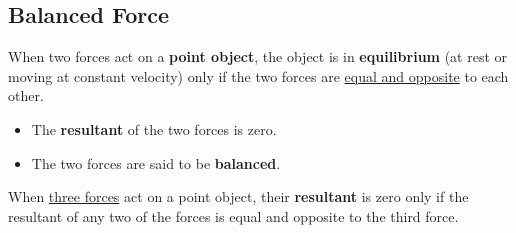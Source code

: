 \subsection{Balanced Force}

When two forces act on a \textbf{point object}, the object is in \textbf{equilibrium} (at rest or moving at constant velocity) only if the two forces are \underline{equal and opposite} to each other.
\begin{itemize}
    \item The \textbf{resultant} of the two forces is zero.
    \item The two forces are said to be \textbf{balanced}.
\end{itemize}

When \underline{three forces} act on a point object, their \textbf{resultant} is zero only if the resultant of any two of the forces is equal and opposite to the third force.
